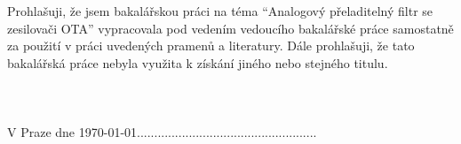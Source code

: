 \vspace{16cm}

Prohlašuji, že jsem bakalářskou práci na téma \enquote{Analogový přeladitelný filtr se zesilovači OTA} vypracovala pod vedením vedoucího bakalářské práce samostatně za použití v práci uvedených pramenů a literatury. Dále prohlašuji, že tato bakalářská práce nebyla využita k získání jiného nebo stejného titulu.\\
\\
\\
\\
V Praze dne \today \hfill \hfill ....................................................
